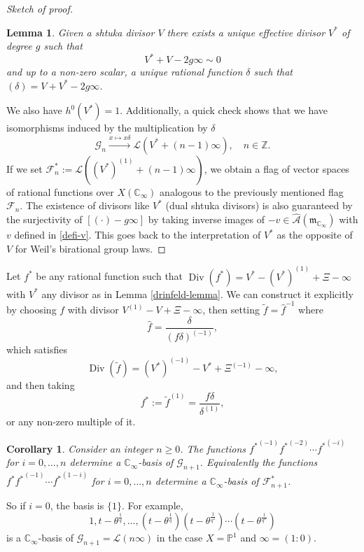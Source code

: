 \documentclass[11pt]{amsart}
\numberwithin{equation}{section}
\newcommand{\Div}{\operatorname{Div}}
\newcommand{\ZZ}{\mathbb{Z}}
\newcommand{\CC}{\mathbb{C}}
\newcommand{\PP}{\mathbb{P}}
\newtheorem{Lemma}[Theorem]{Lemma}
\newtheorem{Corollary}[Theorem]{Corollary}
\begin{document}
\begin{proof}[Sketch of proof]
\begin{Lemma}\label{corollary-Weil}
Given a shtuka divisor $V$ there exists a unique effective divisor $V^*$ of degree $g$ such that
$$V^*+V-2g\infty\sim0$$ and up to a non-zero scalar, a unique rational function $\delta$ such that
$(\delta)=V+V^*-2g\infty$.
\end{Lemma}
We also have $h^0(V^*)=1$. Additionally, a quick check shows that we have isomorphisms induced by the multiplication by $\delta$
\begin{equation}\label{isomorphisms-delta}
\mathcal{G}_n\xrightarrow{x\mapsto x\delta}\mathcal{L}(V^*+(n-1)\infty),\quad n\in\ZZ.
\end{equation}
If we set $\mathcal{F}^*_n:=\mathcal{L}((V^*)^{(1)}+(n-1)\infty)$, we obtain a flag of vector spaces of rational functions over $X(\CC_\infty)$ analogous to the previously mentioned flag $\mathcal{F}_n$.
The existence of divisors like $V^*$ (dual shtuka divisors) is also guaranteed by the surjectivity of $[(\cdot)-g\infty]$ by taking inverse images of $-v\in\widehat{\mathcal{A}}(\mathfrak{m}_{\CC_\infty})$ with $v$ defined in 
\eqref{defi-v}. This goes back to the interpretation of $V^*$ as the opposite of $V$ for Weil's birational group laws.
\end{proof}

Let $f^*$ be any rational function such that $\Div(f^*)=V^*-(V^*)^{(1)}+\Xi-\infty$ with $V^*$ any divisor as in Lemma \ref{drinfeld-lemma}. We can construct it explicitly by choosing $f$ with divisor $V^{(1)}-V+\Xi-\infty$, then setting $\tilde{f}=\hat{f}^{-1}$ where $$\hat{f}=\frac{\delta}{(f\delta)^{(-1)}},$$
which satisfies
$$\Div(\tilde{f})=(V^*)^{(-1)}-V^*+\Xi^{(-1)}-\infty,$$
and then taking
$$f^*:=\tilde{f}^{(1)}=\frac{f\delta}{\delta^{(1)}},$$
or any non-zero multiple of it.

\begin{Corollary}\label{corollary-better-bases-dual}
Consider an integer $n\geq 0$. The functions ${f^*}^{(-1)}{f^*}^{(-2)}\cdots {f^*}^{(-i)}$ for $i=0,\ldots,n$ determine a $\CC_\infty$-basis of $\mathcal{G}_{n+1}$. Equivalently the functions ${f^*}{f^*}^{(-1)}\cdots {f^*}^{(1-i)}$ for $i=0,\ldots,n$ determine a $\CC_\infty$-basis of $\mathcal{F}^*_{n+1}$.
\end{Corollary}
So if $i=0$, the basis is $\{1\}$. For example, $$1,t-\theta^{\frac{1}{q}},\ldots,(t-\theta^{\frac{1}{q}})(t-\theta^{\frac{1}{q^2}})\cdots(t-\theta^{\frac{1}{q^n}})$$
is a $\CC_\infty$-basis of $\mathcal{G}_{n+1}=\mathcal{L}(n\infty)$ in the case $X=\PP^1$ and $\infty=(1:0)$.
\end{document}
